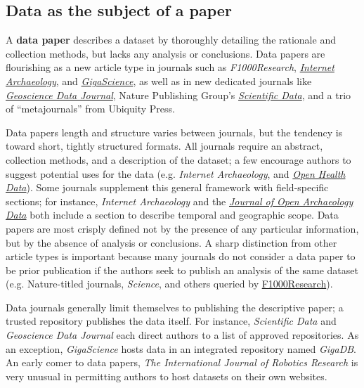 \documentclass[10pt,twocolumn]{article}
\begin{document}
\subsection*{Data as the subject of a paper}\label{paper-subject-data}

A \textbf{data paper} describes a dataset by thoroughly detailing the rationale and collection methods, but lacks any analysis or conclusions.\cite{newman_data_2009}
Data papers are flourishing as a new article type in journals such as \emph{F1000Research}, \href{http://www.internetarchaeology.org/}{\emph{Internet Archaeology}}, and \href{http://www.gigasciencejournal.com/}{\emph{GigaScience}}\cite{gigascience}, as well as in new dedicated journals like \href{http://onlinelibrary.wiley.com/journal/10.1002/%28ISSN%292049-6060}{\emph{Geoscience Data Journal}}\cite{geoscience_data_journal}, Nature Publishing Group's \href{http://www.nature.com/scientificdata/}{\emph{Scientific Data}}, and a trio of ``metajournals'' from Ubiquity Press.

Data papers length and structure varies between journals, but the tendency is toward short, tightly structured formats.
All journals require an abstract, collection methods, and a description of the dataset; a few encourage authors to suggest potential uses for the data (e.g. \emph{Internet Archaeology}, and \href{http://openhealthdata.metajnl.com/about/submissions#authorGuidelines}{\emph{Open Health Data}}).
Some journals supplement this general framework with field-specific sections; for instance, \emph{Internet Archaeology} and the \href{http://openarchaeologydata.metajnl.com/}{\emph{Journal of Open Archaeology Data}} both include a section to describe temporal and geographic scope.
Data papers are most crisply defined not by the presence of any particular information, but by the absence of analysis or conclusions.
A sharp distinction from other article types is important because many journals do not consider a data paper to be prior publication if the authors seek to publish an analysis of the same dataset (e.g. Nature-titled journals, \emph{Science}, and others queried by \href{https://f1000research.com/data-policies}{F1000Research}).

Data journals generally limit themselves to publishing the descriptive paper; a trusted repository publishes the data itself.
For instance, \emph{Scientific Data} and \emph{Geoscience Data Journal} each direct authors to a list of approved repositories.
As an exception, \emph{GigaScience} hosts data in an integrated repository named \emph{GigaDB}.
An early comer to data papers, \emph{The International Journal of Robotics Research}\cite{international_journal_of_robotics_research}\cite{newman_data_2009} is very unusual in permitting authors to host datasets on their own websites.
\end{document}
